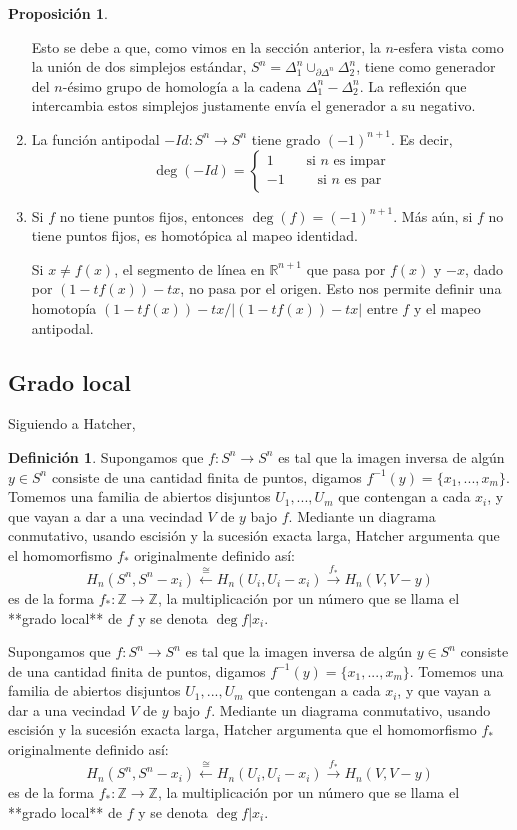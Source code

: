\documentclass[spanish]{book}
\theoremstyle{definition}
\newtheorem*{defn}{Definición}
\newtheorem*{prop}{Proposición}
\newcommand{\R}{\mathbb{R}}
\newcommand{\Z}{\mathbb{Z}}
\begin{document}
\begin{prop}
\begin{enumerate}
			Esto se debe a que, como vimos en la sección anterior, la $n$-esfera vista como la unión de dos simplejos estándar, $S^n=\Delta_1^n\cup_{\partial\Delta^n}\Delta_2^n$, tiene como generador del $n$-ésimo grupo de homología a la cadena $\Delta_1^n-\Delta_2^n$. La reflexión que intercambia estos simplejos justamente envía el generador a su negativo.
			\item La función antipodal $-Id:S^n\to S^n$ tiene grado $(-1)^{n+1}$. Es decir,
			\[\deg (-Id)=\begin{cases}1\qquad\text{ si }n\text{ es impar}\\
				-1\qquad\text{ si }n\text{ es par}\end{cases}\]
			\item Si $f$ no tiene puntos fijos, entonces $\deg (f)=(-1)^{n+1}$. Más aún, si $f$ no tiene puntos fijos, es homotópica al mapeo identidad.
			
			Si $x\neq f(x)$, el segmento de línea en $\R^{n+1}$ que pasa por $f(x)$ y $-x$, dado por $(1-tf(x))-tx$, no pasa por el origen. Esto nos permite definir una homotopía $(1-tf(x))-tx/|(1-tf(x))-tx|$ entre $f$ y el mapeo antipodal. 
		\end{enumerate}
	\end{prop}
\subsection{Grado local}
	Siguiendo a Hatcher,
	\begin{defn}
		Supongamos que $f:S^n\to S^n$ es tal que la imagen inversa de algún $y\in S^n$ consiste de una cantidad finita de puntos, digamos $f^{-1}(y)=\{x_1,...,x_m\}$. Tomemos una familia de abiertos disjuntos $U_1,...,U_m$ que contengan a cada $x_i$, y que vayan a dar a una vecindad $V$ de $y$ bajo $f$. Mediante un diagrama conmutativo, usando escisión y la sucesión exacta larga, Hatcher argumenta que el homomorfismo $f_*$ originalmente definido así:
		\[H_n(S^n,S^n-x_i)\xleftarrow{\cong}H_n(U_i,U_i-x_i)\xrightarrow{f_*}H_n(V,V-y)\]
		es de la forma $f_*:\Z \to \Z$, la multiplicación por un número que se llama el **grado local** de $f$ y se denota $\deg f|x_i$.
	\end{defn}
	Supongamos que $f:S^n\to S^n$ es tal que la imagen inversa de algún $y\in S^n$ consiste de una cantidad finita de puntos, digamos $f^{-1}(y)=\{x_1,...,x_m\}$. Tomemos una familia de abiertos disjuntos $U_1,...,U_m$ que contengan a cada $x_i$, y que vayan a dar a una vecindad $V$ de $y$ bajo $f$. Mediante un diagrama conmutativo, usando escisión y la sucesión exacta larga, Hatcher argumenta que el homomorfismo $f_*$ originalmente definido así:
	\[H_n(S^n,S^n-x_i)\xleftarrow{\cong}H_n(U_i,U_i-x_i)\xrightarrow{f_*}H_n(V,V-y)\]
	es de la forma $f_*:\Z \to \Z$, la multiplicación por un número que se llama el **grado local** de $f$ y se denota $\deg f|x_i$.
	
\end{document}
